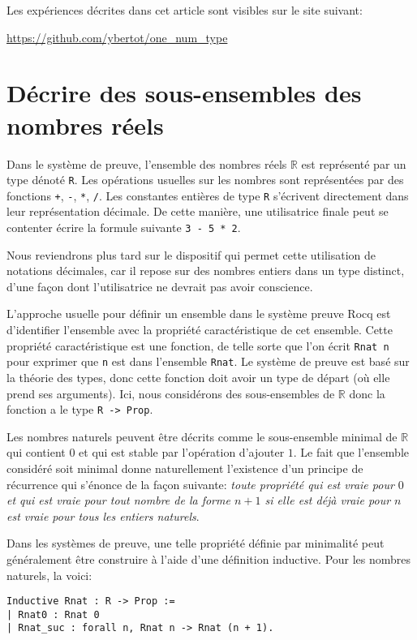\documentclass{modjflart}
\begin{document}
Les expériences décrites dans cet article sont visibles sur le site
suivant:

\url{https://github.com/ybertot/one_num_type}


\section{Décrire des sous-ensembles des nombres réels}
Dans le système de preuve, l'ensemble des nombres réels \(\mathbb R\)
est représenté par un type dénoté \texttt{R}.  Les opérations usuelles
sur les nombres sont représentées par des fonctions \texttt{+}, \texttt{-},
\texttt{*}, \texttt{/}.  Les constantes entières de type \texttt{R} s'écrivent
directement dans leur représentation décimale.  De cette manière, une
utilisatrice finale peut se contenter écrire la formule suivante
\texttt{3 - 5 * 2}.

Nous reviendrons plus tard sur le dispositif qui permet cette
utilisation de notations décimales, car il repose sur des nombres
entiers dans un type distinct, d'une façon dont l'utilisatrice ne
devrait pas avoir conscience.

L'approche usuelle pour définir un ensemble dans le système preuve
Rocq est d'identifier l'ensemble avec la propriété caractéristique de
cet ensemble.  Cette propriété caractéristique est une fonction, de
telle sorte que l'on écrit \texttt{Rnat n} pour exprimer que \texttt{n} est
dans l'ensemble \texttt{Rnat}.  Le système de preuve est basé sur la
théorie des types, donc cette fonction doit avoir un type de départ
(où elle prend ses arguments).  Ici, nous considérons des
sous-ensembles de \(\mathbb R\) donc la fonction a le type \texttt{R ->
  Prop}.

Les nombres naturels peuvent être décrits comme le sous-ensemble
minimal de \(\mathbb R\) qui contient \(0\) et qui est stable par
l'opération d'ajouter \(1\).  Le fait que l'ensemble considéré soit
minimal donne naturellement l'existence d'un principe de récurrence
qui s'énonce de la façon suivante: {\em toute propriété qui est vraie
  pour \(0\) et qui est vraie pour tout nombre de la forme \(n + 1\)
  si elle est déjà vraie pour \(n\) est vraie pour tous les entiers
  naturels}.

Dans les systèmes de preuve, une telle propriété définie par minimalité
peut généralement être construire à l'aide d'une définition inductive.
Pour les nombres naturels, la voici:
\begin{verbatim}
Inductive Rnat : R -> Prop :=
| Rnat0 : Rnat 0
| Rnat_suc : forall n, Rnat n -> Rnat (n + 1).
\end{verbatim}
\end{document}
